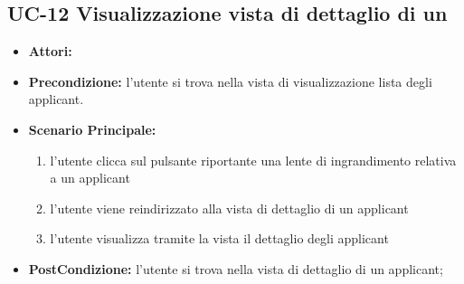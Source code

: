 \subsection{UC-12 Visualizzazione vista di dettaglio di un\applicant}
\begin{itemize}
\item \textbf{Attori:}\loggedusr
\item \textbf{Precondizione:} l'utente si trova nella vista di visualizzazione lista degli applicant. 
\item \textbf{Scenario Principale:}
\begin{enumerate}
	\item l'utente clicca sul pulsante riportante una lente di ingrandimento relativa a un applicant
	\item l'utente viene reindirizzato alla vista di dettaglio di un applicant
	\item l'utente visualizza tramite la vista il dettaglio degli applicant
\end{enumerate}
\item \textbf{PostCondizione:} l'utente si trova nella vista di dettaglio di un applicant;
\end{itemize}


